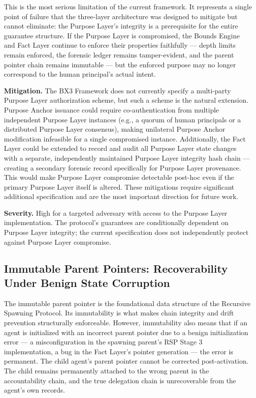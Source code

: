 This is the most serious limitation of the current framework. It represents a single point of failure that the three-layer architecture was designed to mitigate but cannot eliminate: the Purpose Layer's integrity is a prerequisite for the entire guarantee structure. If the Purpose Layer is compromised, the Bounds Engine and Fact Layer continue to enforce their properties faithfully — depth limits remain enforced, the forensic ledger remains tamper-evident, and the parent pointer chain remains immutable — but the enforced purpose may no longer correspond to the human principal's actual intent.

\textbf{Mitigation.} The BX3 Framework does not currently specify a multi-party Purpose Layer authorization scheme, but such a scheme is the natural extension. Purpose Anchor issuance could require co-authentication from multiple independent Purpose Layer instances (e.g., a quorum of human principals or a distributed Purpose Layer consensus), making unilateral Purpose Anchor modification infeasible for a single compromised instance. Additionally, the Fact Layer could be extended to record and audit all Purpose Layer state changes with a separate, independently maintained Purpose Layer integrity hash chain — creating a secondary forensic record specifically for Purpose Layer provenance. This would make Purpose Layer compromise detectable post-hoc even if the primary Purpose Layer itself is altered. These mitigations require significant additional specification and are the most important direction for future work.

\textbf{Severity.} High for a targeted adversary with access to the Purpose Layer implementation. The protocol's guarantees are conditionally dependent on Purpose Layer integrity; the current specification does not independently protect against Purpose Layer compromise.

\subsection{Immutable Parent Pointers: Recoverability Under Benign State Corruption}

The immutable parent pointer is the foundational data structure of the Recursive Spawning Protocol. Its immutability is what makes chain integrity and drift prevention structurally enforceable. However, immutability also means that if an agent is initialized with an incorrect parent pointer due to a benign initialization error — a misconfiguration in the spawning parent's RSP Stage 3 implementation, a bug in the Fact Layer's pointer generation — the error is permanent. The child agent's parent pointer cannot be corrected post-activation. The child remains permanently attached to the wrong parent in the accountability chain, and the true delegation chain is unrecoverable from the agent's own records.

